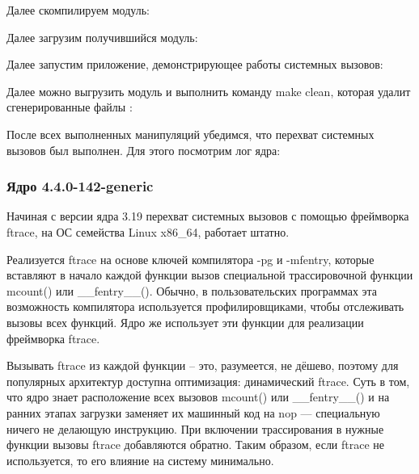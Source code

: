 

\par Далее скомпилируем модуль:



\par Далее загрузим получившийся модуль:



\par Далее запустим приложение, демонстрирующее работы системных вызовов:



\par Далее можно выгрузить модуль и выполнить команду make clean, которая удалит сгенерированные файлы :




\par После всех выполненных манипуляций убедимся, что перехват системных вызовов был выполнен. Для этого посмотрим лог ядра:







\subsubsection{Ядро 4.4.0-142-generic} %

\par Начиная с версии ядра 3.19 перехват системных вызовов с помощью фреймворка ftrace, на ОС семейства Linux x86\_64, работает штатно.

\par Реализуется ftrace на основе ключей компилятора -pg и -mfentry, которые вставляют в начало каждой функции вызов специальной трассировочной функции mcount() или \_\_fentry\_\_(). Обычно, в пользовательских программах эта возможность компилятора используется профилировщиками, чтобы отслеживать вызовы всех функций. Ядро же использует эти функции для реализации фреймворка ftrace.

\par Вызывать ftrace из каждой функции -- это, разумеется, не дёшево, поэтому для популярных архитектур доступна оптимизация: динамический ftrace. Суть в том, что ядро знает расположение всех вызовов mcount() или \_\_fentry\_\_() и на ранних этапах загрузки заменяет их машинный код на nop — специальную ничего не делающую инструкцию. При включении трассирования в нужные функции вызовы ftrace добавляются обратно. Таким образом, если ftrace не используется, то его влияние на систему минимально.

